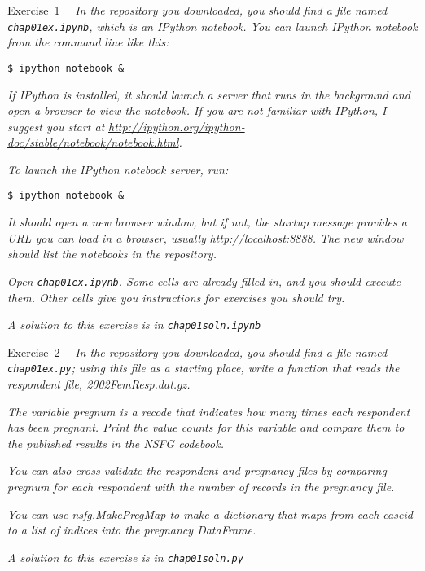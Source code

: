 \documentclass[]{book}
\begin{document}
Exercise~1~~ \emph{In the repository you
downloaded, you should find a file named \texttt{chap01ex.ipynb}, which is an
IPython notebook. You can launch IPython notebook from the command line
like this:}

\begin{verbatim}
$ ipython notebook &
\end{verbatim}

\emph{If IPython is installed, it should
launch a server that runs in the background and open a browser to view
the notebook. If you are not familiar with IPython, I suggest you start
at} \href{http://ipython.org/ipython-doc/stable/notebook/notebook.html}{\emph{http://ipython.org/ipython-doc/stable/notebook/notebook.html}}\emph{.}

\emph{To launch the IPython notebook server,
run:}

\begin{verbatim}
$ ipython notebook &
\end{verbatim}

\emph{It should open a new browser window, but
if not, the startup message provides a URL you can load in a browser,
usually} \href{http://localhost:8888}{\emph{http://localhost:8888}}\emph{. The new window should list the notebooks in
the repository.}

\emph{Open \texttt{chap01ex.ipynb}. Some cells are
already filled in, and you should execute them. Other cells give you
instructions for exercises you should try.}

\emph{A solution to this exercise is in
\texttt{chap01soln.ipynb}}

Exercise~2~~ \emph{In the repository you
downloaded, you should find a file named \texttt{chap01ex.py}; using this file
as a starting place, write a function that reads the respondent file,
2002FemResp.dat.gz.}

\emph{The variable pregnum is a recode that indicates
how many times each respondent has been pregnant. Print the value counts
for this variable and compare them to the published results in the NSFG
codebook.}

\emph{You can also cross-validate the
respondent and pregnancy files by comparing pregnum for each respondent with
the number of records in the pregnancy file.}

\emph{You can use nsfg.MakePregMap to make a
dictionary that maps from each caseid to a list of indices into
the pregnancy DataFrame.}

\emph{A solution to this exercise is in
\texttt{chap01soln.py}}
\end{document}
